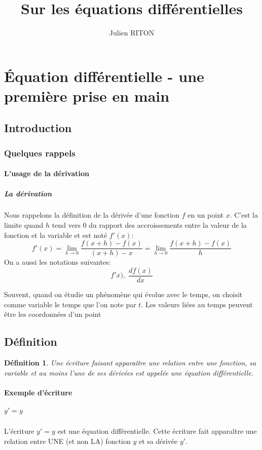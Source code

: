 \documentclass[10pt,a4paper]{article}
\author{Julien RITON}
\title{Sur les équations différentielles}
\newtheorem{dfn}{Définition}
\begin{document}
\maketitle
\section{Équation différentielle - une première prise en main}

\subsection{Introduction}
\subsubsection{Quelques rappels}
\paragraph{L'usage de la dérivation}
\subparagraph{La dérivation}
Nous rappelons la définition de la dérivée d'une fonction $f$ en un point $x$.
C'est la limite quand $h$ tend vers $0$ du rapport des accroissements entre la valeur de la fonction et la variable et est noté $f'(x)$:
$$
f'(x)=\lim_{h\rightarrow 0} \dfrac{f(x+h)-f(x)}{(x+h)-x}
=\lim_{h\rightarrow 0} \dfrac{f(x+h)-f(x)}{h}
$$
On a aussi les notations suivantes:
$$f'x), \; \dfrac{df(x)}{dx} $$





Souvent, quand on étudie un phénomène qui évolue avec le temps, on choisit comme variable le temps que l'on note par $t$. Les valeurs liées au temps peuvent être les coordonnées d'un point
\subsection{Définition}
\begin{dfn}
Une écriture faisant apparaître une relation entre une fonction, sa variable et au moins l'une de ses dérivées est appelée une équation différentielle.
\end{dfn}
\paragraph{Exemple d'écriture}

\subparagraph{$y'=y$}
L'écriture $y'=y$ est une équation différentielle. Cette écriture fait apparaître une relation entre UNE (et non LA) fonction $y$
et sa dérivée $y'$.
\end{document}
